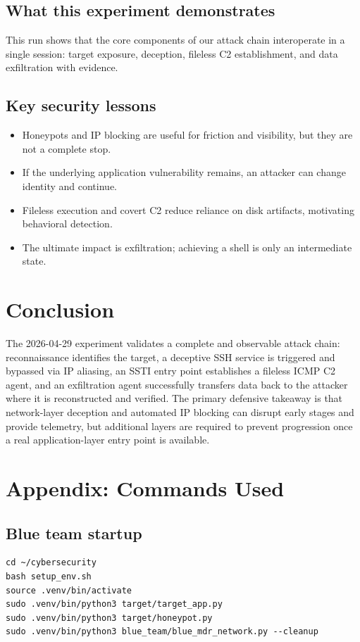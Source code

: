 \documentclass[11pt]{article}
\begin{document}
\subsection{What this experiment demonstrates}
This run shows that the core components of our attack chain interoperate in a single session: target exposure, deception, fileless C2 establishment, and data exfiltration with evidence.

\subsection{Key security lessons}
\begin{itemize}[leftmargin=*]
  \item Honeypots and IP blocking are useful for friction and visibility, but they are not a complete stop.
  \item If the underlying application vulnerability remains, an attacker can change identity and continue.
  \item Fileless execution and covert C2 reduce reliance on disk artifacts, motivating behavioral detection.
  \item The ultimate impact is exfiltration; achieving a shell is only an intermediate state.
\end{itemize}

\section{Conclusion}

The 2026-04-29 experiment validates a complete and observable attack chain: reconnaissance identifies the target, a deceptive SSH service is triggered and bypassed via IP aliasing, an SSTI entry point establishes a fileless ICMP C2 agent, and an exfiltration agent successfully transfers data back to the attacker where it is reconstructed and verified. The primary defensive takeaway is that network-layer deception and automated IP blocking can disrupt early stages and provide telemetry, but additional layers are required to prevent progression once a real application-layer entry point is available.

\section{Appendix: Commands Used}

\subsection{Blue team startup}
\begin{lstlisting}
cd ~/cybersecurity
bash setup_env.sh
source .venv/bin/activate
sudo .venv/bin/python3 target/target_app.py
sudo .venv/bin/python3 target/honeypot.py
sudo .venv/bin/python3 blue_team/blue_mdr_network.py --cleanup
\end{lstlisting}
\end{document}

